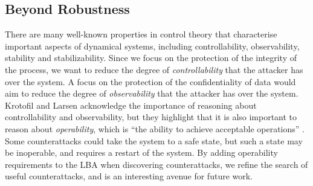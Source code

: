 {%


\subsection{Beyond Robustness}
There are many well-known properties in control theory that characterise important aspects of dynamical systems, including {controllability, observability, stability} and {stabilizability}. Since we focus on the protection of the integrity of the process, we want to reduce the degree of \emph{controllability} that the attacker has over the system. A focus on the protection of the confidentiality of data would aim to reduce the degree of \emph{observability} that the attacker has over the system. Krotofil and Larsen acknowledge the importance of reasoning about {controllability} and {observability}, but they highlight that it is also important to reason about \emph{operability}, which is ``the ability to achieve acceptable operations'' \cite{krotofil2015rocking}. Some counterattacks could take the system to a safe state, but such a state may be inoperable, and requires a restart of the system. By adding operability requirements to the LBA when discovering counterattacks, we refine the search of useful counterattacks, and is an interesting avenue for future work. 
 
}
